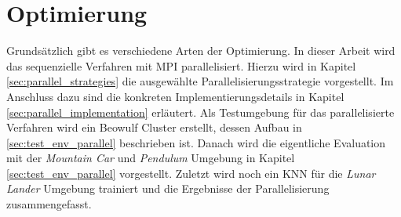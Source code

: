 \chapter{Optimierung}
\label{chap:optimization}
Grundsätzlich gibt es verschiedene Arten der Optimierung. In dieser Arbeit wird das sequenzielle Verfahren mit \ac{MPI} parallelisiert. Hierzu wird in Kapitel \ref{sec:parallel_strategies} die ausgewählte Parallelisierungsstrategie vorgestellt. Im Anschluss dazu sind die konkreten Implementierungsdetails in Kapitel \ref{sec:parallel_implementation} erläutert. Als Testumgebung für das parallelisierte Verfahren wird ein Beowulf Cluster erstellt, dessen Aufbau in \ref{sec:test_env_parallel} beschrieben ist. Danach wird die eigentliche Evaluation mit der \emph{Mountain Car} und \emph{Pendulum} Umgebung in Kapitel \ref{sec:test_env_parallel} vorgestellt. Zuletzt wird noch ein \ac{KNN} für die \emph{Lunar Lander} Umgebung trainiert und die Ergebnisse der Parallelisierung zusammengefasst.








